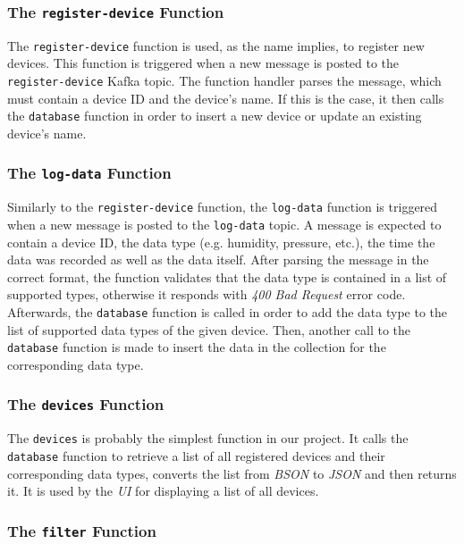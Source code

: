 \subsubsection{The \texttt{register-device} Function}

The \texttt{register-device} function is used, as the name implies, to register new devices. This
function is triggered when a new message is posted to the \texttt{register-device} Kafka topic. The
function handler parses the message, which must contain a device ID and the device's name. If this
is the case, it then calls the \texttt{database} function in order to insert a new device or update
an existing device's name.

\subsubsection{The \texttt{log-data} Function}

Similarly to the \texttt{register-device} function, the \texttt{log-data} function is triggered when
a new message is posted to the \texttt{log-data} topic. A message is expected to contain a device
ID, the data type (e.g. humidity, pressure, etc.), the time the data was recorded as well as the
data itself. After parsing the message in the correct format, the function validates that the data
type is contained in a list of supported types, otherwise it responds with \textit{400 Bad Request}
error code. Afterwards, the \texttt{database} function is called in order to add the data type to
the list of supported data types of the given device. Then, another call to the \texttt{database}
function is made to insert the data in the collection for the corresponding data type.

\subsubsection{The \texttt{devices} Function}

The \texttt{devices} is probably the simplest function in our project. It calls the
\texttt{database} function to retrieve a list of all registered devices and their corresponding data
types, converts the list from \textit{BSON} to \textit{JSON} and then returns it. It is used by the
\textit{UI} for displaying a list of all devices.

\subsubsection{The \texttt{filter} Function}

